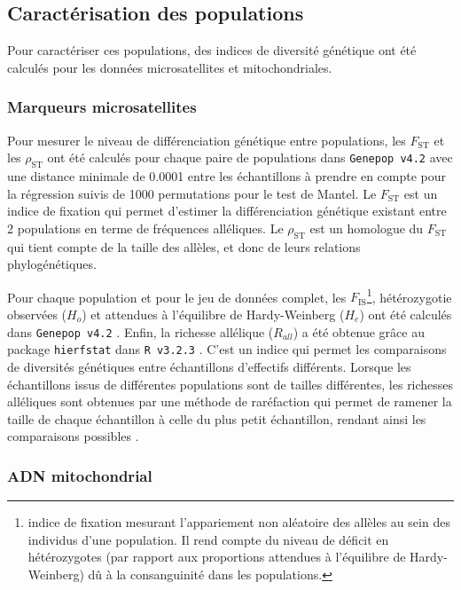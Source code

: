 \documentclass[a4paper,12pt,twoside]{article}\usepackage[]{graphicx}\usepackage[]{color}
\begin{document}
\begin {bibunit} [newbst]
\subsection{Caractérisation des populations}

Pour caractériser ces populations, des indices de diversité génétique ont été calculés pour les données microsatellites et mitochondriales.

\subsubsection*{Marqueurs microsatellites}

Pour mesurer le niveau de différenciation génétique entre populations, les $F_\textrm{ST}$ \citep[méthode de][]{weir1984} et les $\rho_\textrm{ST}$ \citep[méthode de][]{michalakis1996} ont été calculés pour chaque paire de populations dans \texttt{Genepop~v4.2} \citep{rousset2008} avec une distance minimale de 0.0001 entre les échantillons à prendre en compte pour la régression suivis de 1000 permutations pour le test de Mantel. Le $F_\textrm{ST}$ est un indice de fixation qui permet d'estimer la différenciation génétique existant entre 2 populations en terme de fréquences alléliques. Le $\rho_\textrm{ST}$ est un homologue du $F_\textrm{ST}$ qui tient compte de la taille des allèles, et donc de leurs relations phylogénétiques.

Pour chaque population et pour le jeu de données complet, les $F_\textrm{IS}$\footnote{indice de fixation mesurant l'appariement non aléatoire des allèles au sein des individus d'une population. Il rend compte du niveau de déficit en hétérozygotes (par rapport aux proportions attendues à l'équilibre de Hardy-Weinberg) dû à la consanguinité dans les populations.}, hétérozygotie observées ($H_o$) et attendues à l'équilibre de Hardy-Weinberg ($H_e$) ont été calculés dans \texttt{Genepop~v4.2} \citep{rousset2008}. Enfin, la richesse allélique ($R_{all}$) a été obtenue grâce au package \texttt{hierfstat} dans \texttt{R~v3.2.3} \citep{rct2015}. C'est un indice qui permet les comparaisons de diversités génétiques entre échantillons d'effectifs différents. Lorsque les échantillons issus de différentes populations sont de tailles différentes, les richesses alléliques sont obtenues par une méthode de raréfaction qui permet de ramener la taille de chaque échantillon à celle du plus petit échantillon, rendant ainsi les comparaisons possibles \citep{hurlbert1971}.

\subsubsection*{ADN mitochondrial}


\end{bibunit}
\end{document}

